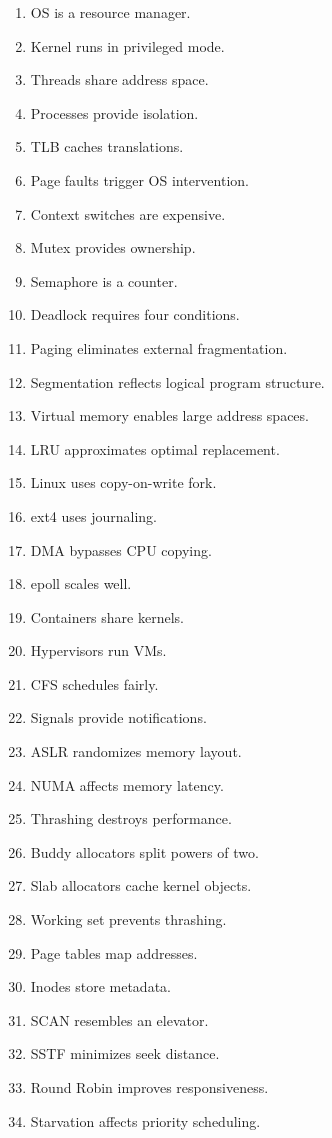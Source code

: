\begin{enumerate}
\item OS is a resource manager.
\item Kernel runs in privileged mode.
\item Threads share address space.
\item Processes provide isolation.
\item TLB caches translations.
\item Page faults trigger OS intervention.
\item Context switches are expensive.
\item Mutex provides ownership.
\item Semaphore is a counter.
\item Deadlock requires four conditions.
\item Paging eliminates external fragmentation.
\item Segmentation reflects logical program structure.
\item Virtual memory enables large address spaces.
\item LRU approximates optimal replacement.
\item Linux uses copy-on-write fork.
\item ext4 uses journaling.
\item DMA bypasses CPU copying.
\item epoll scales well.
\item Containers share kernels.
\item Hypervisors run VMs.
\item CFS schedules fairly.
\item Signals provide notifications.
\item ASLR randomizes memory layout.
\item NUMA affects memory latency.
\item Thrashing destroys performance.
\item Buddy allocators split powers of two.
\item Slab allocators cache kernel objects.
\item Working set prevents thrashing.
\item Page tables map addresses.
\item Inodes store metadata.
\item SCAN resembles an elevator.
\item SSTF minimizes seek distance.
\item Round Robin improves responsiveness.
\item Starvation affects priority scheduling.

\end{enumerate}
